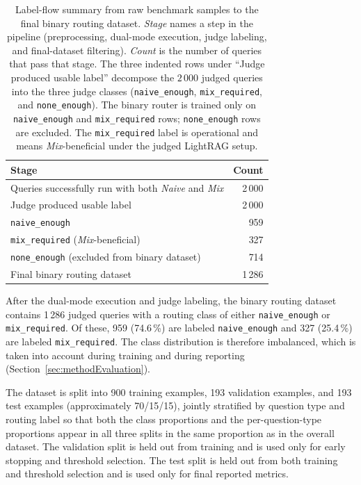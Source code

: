 \documentclass[english, bibtex]{kththesis}               %
\numberwithin{listing}{chapter}
\begin{document}
\begin{table}[!ht]
\begin{center}
\caption{Label-flow summary from raw benchmark samples to the final binary routing dataset. \emph{Stage} names a step in the pipeline (preprocessing, dual-mode execution, judge labeling, and final-dataset filtering). \emph{Count} is the number of queries that pass that stage. The three indented rows under ``Judge produced usable label'' decompose the $2\,000$ judged queries into the three judge classes (\texttt{naive\_enough}, \texttt{mix\_required}, and \texttt{none\_enough}). The binary router is trained only on \texttt{naive\_enough} and \texttt{mix\_required} rows; \texttt{none\_enough} rows are excluded. The \texttt{mix\_required} label is operational and means \emph{Mix}-beneficial under the judged LightRAG setup.}
\label{tab:datasetFlow}
\begin{tabular}{l|r}
\textbf{Stage} & \textbf{Count} \\
\hline
Queries successfully run with both \emph{Naive} and \emph{Mix} & 2\,000 \\
Judge produced usable label & 2\,000 \\
\quad \texttt{naive\_enough} & 959 \\
\quad \texttt{mix\_required} (\emph{Mix}-beneficial) & 327 \\
\quad \texttt{none\_enough} (excluded from binary dataset) & 714 \\
Final binary routing dataset & 1\,286 \\
\end{tabular}
\end{center}
\end{table}

After the dual-mode execution and judge labeling, the binary routing dataset contains 1\,286 judged queries with a routing class of either \texttt{naive\_enough} or \texttt{mix\_required}. Of these, 959 (74.6\,\%) are labeled \texttt{naive\_enough} and 327 (25.4\,\%) are labeled \texttt{mix\_required}. The class distribution is therefore imbalanced, which is taken into account during training and during reporting (Section~\ref{sec:methodEvaluation}).

The dataset is split into 900 training examples, 193 validation examples, and 193 test examples (approximately 70/15/15), jointly stratified by question type and routing label so that both the class proportions and the per-question-type proportions appear in all three splits in the same proportion as in the overall dataset. The validation split is held out from training and is used only for early stopping and threshold selection. The test split is held out from both training and threshold selection and is used only for final reported metrics.
\end{document}
